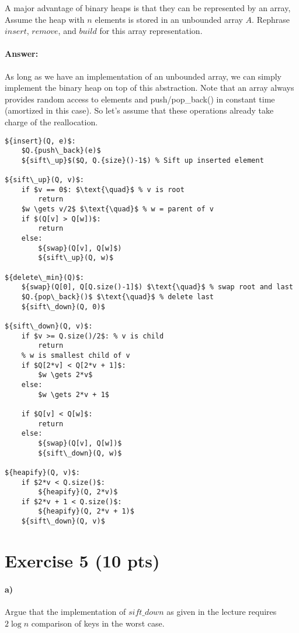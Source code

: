 \documentclass[a4paper]{article}
\begin{document}
A major advantage of binary heaps is that they can be represented by an array, Assume the heap with $n$ elements is stored in an unbounded array $A$. Rephrase ${insert}$, ${remove}$, and ${build}$ for this array representation.

\paragraph{Answer:}

As long as we have an implementation of an unbounded array, we can simply implement the binary heap on top of this abstraction. Note that an array always provides random access to elements and push/pop\_back() in constant time (amortized in this case). So let's assume that these operations already take charge of the reallocation.

\begin{lstlisting}[mathescape]
${insert}(Q, e)$:
    $Q.{push\_back}(e)$
    ${sift\_up}$($Q, Q.{size}()-1$) % Sift up inserted element
    
${sift\_up}(Q, v)$:
    if $v == 0$: $\text{\quad}$ % v is root
        return
    $w \gets v/2$ $\text{\quad}$ % w = parent of v
    if $(Q[v] > Q[w])$:
        return
    else:
        ${swap}(Q[v], Q[w]$)
        ${sift\_up}(Q, w)$

${delete\_min}(Q)$:
    ${swap}(Q[0], Q[Q.size()-1]$) $\text{\quad}$ % swap root and last
    $Q.{pop\_back}()$ $\text{\quad}$ % delete last
    ${sift\_down}(Q, 0)$

${sift\_down}(Q, v)$:
    if $v >= Q.size()/2$: % v is child
        return
    % w is smallest child of v
    if $Q[2*v] < Q[2*v + 1]$:
        $w \gets 2*v$
    else:
        $w \gets 2*v + 1$
        
    if $Q[v] < Q[w]$:
        return
    else:
        ${swap}(Q[v], Q[w])$
        ${sift\_down}(Q, w)$

${heapify}(Q, v)$:
    if $2*v < Q.size()$:
        ${heapify}(Q, 2*v)$
    if $2*v + 1 < Q.size()$:
        ${heapify}(Q, 2*v + 1)$
    ${sift\_down}(Q, v)$
\end{lstlisting}

\section{Exercise 5 (10 pts)}

\paragraph{a) } Argue that the implementation of ${sift\_down}$ as given in the lecture requires $2 \log n$ comparison of keys in the worst case.
\end{document}
